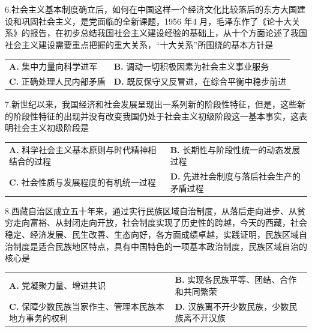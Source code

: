 \documentclass[UTF8,11pt]{ctexart}
\begin{document}
6.社会主义基本制度确立后，如何在中国这样一个经济文化比较落后的东方大国建设和巩固社会主义，是党面临的全新课题，1956 年4 月，毛泽东作了《论十大关系》的报告，在初步总结我国社会主义建设经验的基础上，从十个方面论述了我国社会主义建设需要重点把握的重大关系，“十大关系”所围绕的基本方针是


\begin{center}\begin{tabular}{>{\raggedright\arraybackslash}p{\dimexpr(\linewidth-4\tabcolsep)/2\relax}>{\raggedright\arraybackslash}p{\dimexpr(\linewidth-4\tabcolsep)/2\relax}}
\textbf{A.} 集中力量向科学进军 & \textbf{B.} 调动一切积极因素为社会主义事业服务\\[.35em]
\textbf{C.} 正确处理人民内部矛盾 & \textbf{D.} 既反保守又反冒进，在综合平衡中稳步前进\\[.35em]\end{tabular}\end{center}

7.新世纪以来，我国经济和社会发展呈现出一系列新的阶段性特征，但是，这些新的阶段性特征的出现并没有改变我国仍处于社会主义初级阶段这一基本事实，这表明社会主义初级阶段是


\begin{center}\begin{tabular}{>{\raggedright\arraybackslash}p{\dimexpr(\linewidth-4\tabcolsep)/2\relax}>{\raggedright\arraybackslash}p{\dimexpr(\linewidth-4\tabcolsep)/2\relax}}
\textbf{A.} 科学社会主义基本原则与时代精神相结合的过程 & \textbf{B.} 长期性与阶段性统一的动态发展过程\\[.35em]
\textbf{C.} 社会性质与发展程度的有机统一过程 & \textbf{D.} 先进社会制度与落后社会生产的矛盾过程\\[.35em]\end{tabular}\end{center}

8.西藏自治区成立五十年来，通过实行民族区域自治制度，从落后走向进步、从贫穷走向富裕、从封闭走向开放，社会制度实现了历史性的跨越，今天的西藏，社会稳定、经济发展、民生改善、生态向好，各方面成绩卓越，实践证明，民族区域自治制度是适合民族地区特点，具有中国特色的一项基本政治制度，民族区域自治的核心是


\begin{center}\begin{tabular}{>{\raggedright\arraybackslash}p{\dimexpr(\linewidth-4\tabcolsep)/2\relax}>{\raggedright\arraybackslash}p{\dimexpr(\linewidth-4\tabcolsep)/2\relax}}
\textbf{A.} 党凝聚力量、增进共识 & \textbf{B.} 实现各民族平等、团结、合作和共同繁荣\\[.35em]
\textbf{C.} 保障少数民族当家作主、管理本民族本地方事务的权利 & \textbf{D.} 汉族离不开少数民族，少数民族离不开汉族\\[.35em]\end{tabular}\end{center}
\end{document}
